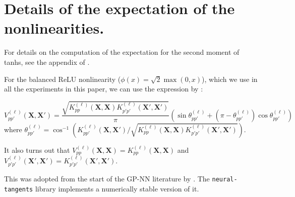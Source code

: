 \documentclass[tablecaption=bottom,wcp,nonatbib]{jmlr} %
\newcommand{\vX}{\mathbf{X}}
\newcommand{\bracket}[3]{{\left#1 #3 \right#2}}
\newcommand{\bra}{\bracket{(}{)}}
\newcommand{\ssup}[1]{^{\bra{#1}}}
\begin{document}
\section{Details of the expectation of the nonlinearities.}
\label{sec:exp-nonlin}
For details on the computation of the expectation for the second moment of 
tanhs, see the appendix of \citep{lee2018dnnlimit}.

For the balanced ReLU nonlinearity ($\phi(x) = \sqrt{2}\max(0, x)$), which we
use in all the experiments in this paper, we can use the expression by \citet{cho2009mkm}:
{
\begin{equation}
  V_{pp'}\ssup{\ell}(\vX, \vX') = \frac{\sqrt{K_{pp}\ssup{\ell}(\vX,\vX)K_{p'p'}\ssup{\ell}(\vX',\vX')}}{\pi} \bra{\sin \theta_{pp'}\ssup{\ell} + (\pi - \theta_{pp'}\ssup{\ell}) \cos \theta_{pp'}\ssup{\ell}}
  \label{eq:nlin-relu}
\end{equation}
where $\theta_{pp'}\ssup{\ell} = \cos^{-1}\left( K_{pp'}\ssup{\ell}(\vX,\vX') /
  \sqrt{K_{pp}\ssup{\ell}(\vX,\vX)K_{p'p'}\ssup{\ell}(\vX',\vX')}\right)$.

It also turns out that $V_{pp}\ssup{\ell}(\vX, \vX) = K_{pp}\ssup{\ell}(\vX,
\vX)$ and $V_{p'p'}\ssup{\ell}(\vX', \vX') = K_{p'p'}\ssup{\ell}(\vX', \vX')$.
}

This was adopted from the start of the GP-NN literature by
\citet{lee2018dnnlimit,matthews2018dnnlimit}. The 
\texttt{neural-tangents} library \citep{neuraltangents2020} implements a
numerically stable version of it.

\end{document}
